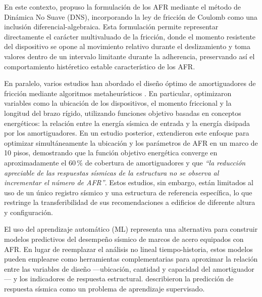 \documentclass[preprint,12pt,authoryear]{elsarticle}
\begin{document}
En este contexto, \citet{Namorado2024} propuso la formulación de los AFR
mediante el método de Dinámica No Suave (DNS), incorporando la ley de fricción
de Coulomb como una inclusión diferencial-algebraica. Esta formulación permite
representar directamente el carácter multivaluado de la fricción, donde el
momento resistente del dispositivo se opone al movimiento relativo durante el
deslizamiento y toma valores dentro de un intervalo limitante durante la
adherencia, preservando así el comportamiento histéretico estable característico
de los AFR.

En paralelo, varios estudios han abordado el diseño óptimo de amortiguadores
de fricción mediante algoritmos metaheurísticos
\citep{moreschi_design_2003, moghaddam_optimal_2022, miguel_simultaneous_2016,
ontiveros-perez_reliability-based_2019}. En particular, \citet{Jarrahi2020jbe} optimizaron
variables como la ubicación de los dispositivos, el momento friccional y la
longitud del brazo rígido, utilizando funciones objetivo basadas en conceptos
energéticos: la relación entre la energía sísmica de entrada y la energía
disipada por los amortiguadores. En un estudio posterior, \citet{Jarrahi2020sdee}
extendieron este enfoque para optimizar simultáneamente la ubicación y los
parámetros de AFR en un marco de 10 pisos, demostrando que la función objetivo
energética converge en aproximadamente el 60\,\% de cobertura de amortiguadores
y que \textit{``la reducción apreciable de las respuestas sísmicas de la
estructura no se observa al incrementar el número de AFR''}. Estos estudios,
sin embargo, están limitados al uso de un único registro sísmico y una estructura
de referencia específica, lo que restringe la transferibilidad de sus
recomendaciones a edificios de diferente altura y configuración.

El uso del aprendizaje automático (ML) representa una alternativa para construir
modelos predictivos del desempeño sísmico de marcos de acero equipados con AFR.
En lugar de reemplazar el análisis no lineal tiempo-historia, estos modelos
pueden emplearse como herramientas complementarias para aproximar la relación
entre las variables de diseño ---ubicación, cantidad y capacidad del
amortiguador--- y los indicadores de respuesta estructural. \citet{Kazemi2022}
describieron la predicción de respuesta sísmica como un problema de aprendizaje
supervisado.
\end{document}
